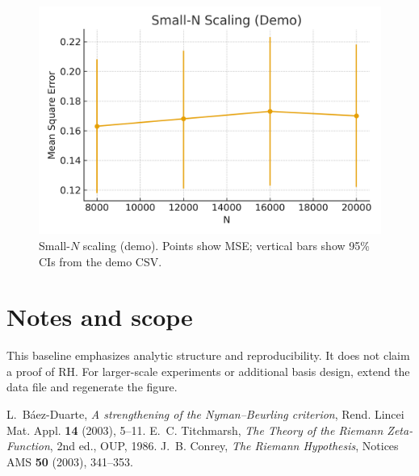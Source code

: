 \documentclass[11pt]{article}
\theoremstyle{remark}
\begin{document}
\begin{figure}[h]
\centering
\includegraphics[width=0.8\linewidth]{figures/figure1.png}
\caption{Small-$N$ scaling (demo). Points show MSE; vertical bars show 95\% CIs from the demo CSV.}
\label{fig:scaling}
\end{figure}

\section{Notes and scope}
This baseline emphasizes analytic structure and reproducibility. It does not claim a proof of RH. 
For larger-scale experiments or additional basis design, extend the data file and regenerate the figure. 

\begin{thebibliography}{9}
 L.~B\'aez-Duarte, \emph{A strengthening of the Nyman--Beurling criterion}, Rend. Lincei Mat. Appl. \textbf{14} (2003), 5--11.
 E.~C. Titchmarsh, \emph{The Theory of the Riemann Zeta-Function}, 2nd ed., OUP, 1986.
 J.~B. Conrey, \emph{The Riemann Hypothesis}, Notices AMS \textbf{50} (2003), 341--353.
\end{thebibliography}
\end{document}
